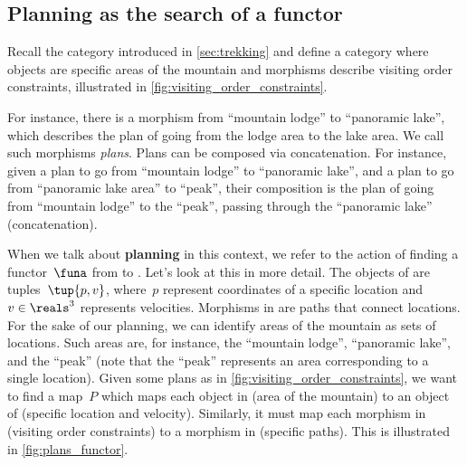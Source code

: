 \subsection{Planning as the search of a functor}

\begin{example}
    \label{ex:planning-as-search-functor}
    Recall the category \Berg introduced in \cref{sec:trekking} and define a category \Plans where objects are specific areas of the mountain and morphisms describe visiting order constraints, illustrated in \cref{fig:visiting_order_constraints}.

    For instance, there is a morphism from ``mountain lodge'' to ``panoramic lake'', which describes the plan of going from the lodge area to the lake area.
    We call such morphisms \emph{plans}.
    Plans can be composed via concatenation.
    For instance, given a plan to go from ``mountain lodge'' to ``panoramic lake'', and a plan to go from ``panoramic lake area'' to ``peak'', their composition is the plan of going from ``mountain lodge'' to the ``peak'', passing through the ``panoramic lake'' (concatenation).

    When we talk about \textbf{planning} in this context, we refer to the action of finding a functor~$\funa$ from \Plans to \Berg.
    Let's look at this in more detail.
    The objects of \Berg are tuples~$\tup{p,v}$, where~$p$ represent coordinates of a specific location and~$v\in \reals^3$ represents velocities.
    Morphisms in \Berg are paths that connect locations.
    For the sake of our planning, we can identify areas of the mountain as sets of locations.
    Such areas are, for instance, the ``mountain lodge'', ``panoramic lake'', and the
    ``peak'' (note that the ``peak'' represents an area corresponding to a single location).
    Given some plans as in \cref{fig:visiting_order_constraints}, we want to find a map~$P$ which maps each object in \Plans (area of the mountain) to an object of \Berg (specific location and velocity).
    Similarly, it must map each morphism in \Plans (visiting order constraints) to a morphism in \Berg (specific paths).
    This is illustrated in \cref{fig:plans_functor}.
\end{example}

\begin{figure*}[h!]
    \centering
    \caption{Planning functor.}
    \label{fig:plans_functor}
\end{figure*}

